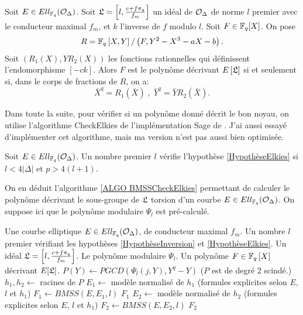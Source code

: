 \begin{Prop}\label{propositionCheckElkies}
	Soit $E\in Ell_{\mathbb{F}_{q}}(\mathcal{O}_{\Delta})$. Soit $\mathfrak{L} = \left[ l, \frac{c + f\pi_{q}}{f_{m}}\right]$ un idéal de $\mathcal{O}_{\Delta}$ de norme $l$ premier avec le conducteur maximal $f_m$, et $k$ l'inverse de $f$ modulo $l$. Soit $F\in\mathbb{F}_{q}[X]$. On pose 
	\begin{equation*}
		R = \mathbb{F}_{q}\left[ X,Y\right] / \left( F, Y^2 - X^3 - aX - b\right).
	\end{equation*}
	Soit $(R_{1}(X), YR_{2}(X))$ les fonctions rationnelles qui définissent l'endomorphisme $[-ck]$. Alors $F$ est le polynôme décrivant $E\left[ \mathfrak{L}\right]$ si et seulement si, dans le corps de fractions de $R$, on a:
	\begin{equation*}
		\bar{X}^q = R_{1}(\bar{X})\;,\;\bar{Y}^{q} = \bar{Y}R_{2}(\bar{X}).
	\end{equation*}
\end{Prop}

\begin{Rem}
	Dans toute la suite, pour vérifier si un polynôme donné décrit le bon noyau, on utilise l'algorithme CheckElkies de l'implémentation Sage de \cite{Pegasis}. J'ai aussi essayé d'implémenter cet algorithme, mais ma version n'est pas aussi bien optimisée.  
\end{Rem}

\begin{Hyp}\label{HypothèseElkies}
	Soit $E\in Ell_{\mathbb{F}_{q}}(\mathcal{O}_{\Delta})$. Un nombre premier $l$ vérifie l'hypothèse \ref{HypothèseElkies} si $l < 4|\Delta|$ et $p > 4(l+1)$.
\end{Hyp}

On en déduit l'algorithme \ref{ALGO BMSSCheckElkies} permettant de calculer le polynôme décrivant le sous-groupe de $\mathfrak{L}$ torsion d'un courbe $E\in Ell_{\mathbb{F}_{q}}(\mathcal{O}_{\Delta})$. On suppose ici que le polynôme modulaire $\Psi_{l}$ est pré-calculé.  

\begin{algorithm}[h]
	\caption{Méthode d'Elkies}\label{ALGO BMSSCheckElkies}
	\begin{algorithmic}[1]
		\Require Une courbe elliptique $E\in Ell_{\mathbb{F}_{q}}(\mathcal{O}_{\Delta})$, de conducteur maximal $f_m$. Un nombre $l$ premier  vérifiant les hypothèses \ref{HypothèseInversion} et \ref{HypothèseElkies}. Un idéal $\mathfrak{L} = \left[ l, \frac{c + f\pi_{q}}{f_{m}}\right]$. Le polynôme modulaire $\Psi_{l}$.
		\Ensure Un polynôme $F\in\mathbb{F}_{q}\left[ X\right]$ décrivant $E[\mathfrak{L}]$. 
		\State $P(Y)\gets PGCD(\Psi_{l}(j,Y),Y^q - Y)$ ($P$ est de degré 2 scindé.)
		\State $h_{1}, h_{2}\gets$ racines de $P$
		\State $E_{1}\gets$ modèle normalisé de $h_{1}$ (formules explicites selon $E$, $l$ et $h_1$)
		\State $F_{1}\gets BMSS(E,E_{1},l)$
		\State \Return $F_{1}$
		\Else 
		\State $E_{2}\gets$ modèle normalisé de $h_{2}$ (formules explicites selon $E$, $l$ et $h_1$)
		\State $F_{2}\gets BMSS(E,E_{2},l)$
		\State \Return $F_{2}$
		\EndIf
	\end{algorithmic}
\end{algorithm}

